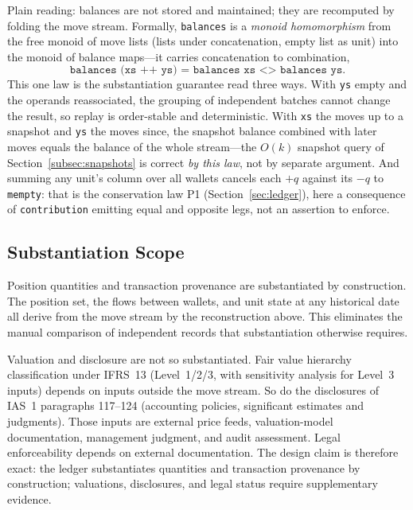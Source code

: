 \begin{remark}
Plain reading: balances are not stored and maintained; they are recomputed by folding the move stream. Formally, \lstinline!balances! is a \emph{monoid homomorphism} from the free monoid of move lists (lists under concatenation, empty list as unit) into the monoid of balance maps---it carries concatenation to combination,
\[
\texttt{balances (xs ++ ys) = balances xs <> balances ys}.
\]
This one law is the substantiation guarantee read three ways. With \texttt{ys} empty and the operands reassociated, the grouping of independent batches cannot change the result, so replay is order-stable and deterministic. With \texttt{xs} the moves up to a snapshot and \texttt{ys} the moves since, the snapshot balance combined with later moves equals the balance of the whole stream---the $O(k)$ snapshot query of Section~\ref{subsec:snapshots} is correct \emph{by this law}, not by separate argument. And summing any unit's column over all wallets cancels each $+q$ against its $-q$ to \texttt{mempty}: that is the conservation law P1 (Section~\ref{sec:ledger}), here a consequence of \lstinline!contribution! emitting equal and opposite legs, not an assertion to enforce.
\end{remark}

\subsection{Substantiation Scope}

Position quantities and transaction provenance are substantiated by construction. The position set, the flows between wallets, and unit state at any historical date all derive from the move stream by the reconstruction above. This eliminates the manual comparison of independent records that substantiation otherwise requires.

Valuation and disclosure are not so substantiated. Fair value hierarchy classification under IFRS~13 (Level~1/2/3, with sensitivity analysis for Level~3 inputs) depends on inputs outside the move stream. So do the disclosures of IAS~1 paragraphs 117--124 (accounting policies, significant estimates and judgments). Those inputs are external price feeds, valuation-model documentation, management judgment, and audit assessment. Legal enforceability depends on external documentation. The design claim is therefore exact: the ledger substantiates quantities and transaction provenance by construction; valuations, disclosures, and legal status require supplementary evidence.

